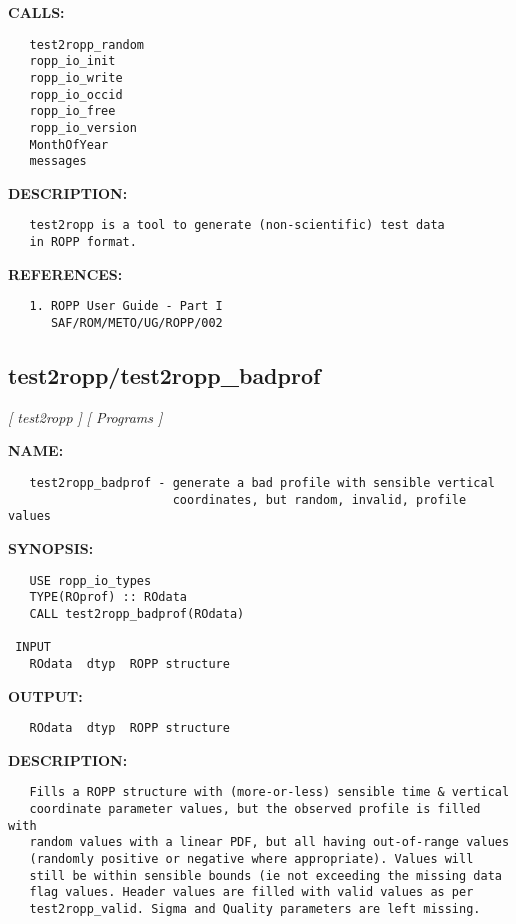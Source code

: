 \textbf{CALLS:}\hspace{0.08in}\begin{Verbatim}
   test2ropp_random
   ropp_io_init
   ropp_io_write
   ropp_io_occid
   ropp_io_free
   ropp_io_version
   MonthOfYear
   messages
\end{Verbatim}
\textbf{DESCRIPTION:}\hspace{0.08in}\begin{Verbatim}
   test2ropp is a tool to generate (non-scientific) test data
   in ROPP format.
\end{Verbatim}
\textbf{REFERENCES:}\hspace{0.08in}\begin{Verbatim}
   1. ROPP User Guide - Part I
      SAF/ROM/METO/UG/ROPP/002
\end{Verbatim}
\subsection{test2ropp/test2ropp\_badprof}
\textsl{[ test2ropp ]}
\textsl{[ Programs ]}

\label{ch:robo104}
\label{ch:test2ropp_test2ropp_badprof}
\textbf{NAME:}\hspace{0.08in}\begin{Verbatim}
   test2ropp_badprof - generate a bad profile with sensible vertical
                       coordinates, but random, invalid, profile values
\end{Verbatim}
\textbf{SYNOPSIS:}\hspace{0.08in}\begin{Verbatim}
   USE ropp_io_types
   TYPE(ROprof) :: ROdata
   CALL test2ropp_badprof(ROdata)

 INPUT
   ROdata  dtyp  ROPP structure
\end{Verbatim}
\textbf{OUTPUT:}\hspace{0.08in}\begin{Verbatim}
   ROdata  dtyp  ROPP structure
\end{Verbatim}
\textbf{DESCRIPTION:}\hspace{0.08in}\begin{Verbatim}
   Fills a ROPP structure with (more-or-less) sensible time & vertical
   coordinate parameter values, but the observed profile is filled with
   random values with a linear PDF, but all having out-of-range values
   (randomly positive or negative where appropriate). Values will
   still be within sensible bounds (ie not exceeding the missing data
   flag values. Header values are filled with valid values as per
   test2ropp_valid. Sigma and Quality parameters are left missing.
\end{Verbatim}
